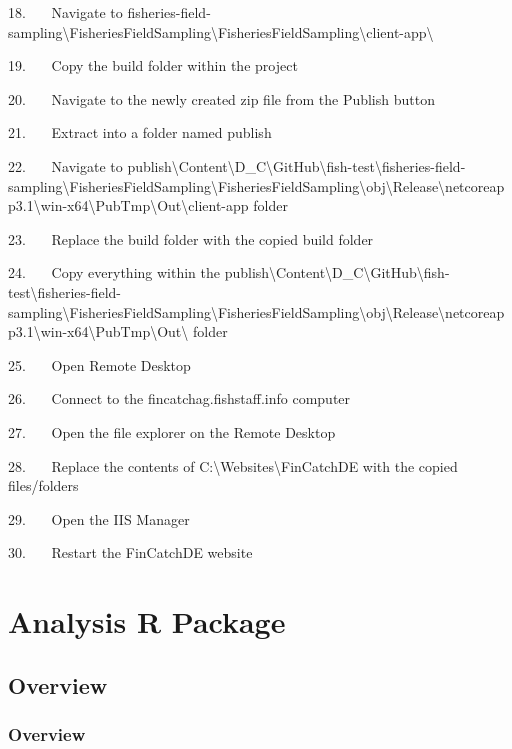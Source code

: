 \documentclass[
  letterpaper,
  DIV=11,
  numbers=noendperiod]{scrreprt}
\begin{document}
18.~~~ Navigate to
fisheries-field-sampling\textbackslash FisheriesFieldSampling\textbackslash FisheriesFieldSampling\textbackslash client-app\textbackslash{}

19.~~~ Copy the build folder within the project

20.~~~ Navigate to the newly created zip file from the Publish button

21.~~~ Extract into a folder named publish

22.~~~ Navigate to
publish\textbackslash Content\textbackslash D\_C\textbackslash GitHub\textbackslash fish-test\textbackslash fisheries-field-sampling\textbackslash FisheriesFieldSampling\textbackslash FisheriesFieldSampling\textbackslash obj\textbackslash Release\textbackslash netcoreapp3.1\textbackslash win-x64\textbackslash PubTmp\textbackslash Out\textbackslash client-app
folder

23.~~~ Replace the build folder with the copied build folder

24.~~~ Copy everything within the
publish\textbackslash Content\textbackslash D\_C\textbackslash GitHub\textbackslash fish-test\textbackslash fisheries-field-sampling\textbackslash FisheriesFieldSampling\textbackslash FisheriesFieldSampling\textbackslash obj\textbackslash Release\textbackslash netcoreapp3.1\textbackslash win-x64\textbackslash PubTmp\textbackslash Out\textbackslash{}
folder

25.~~~ Open Remote Desktop

26.~~~ Connect to the fincatchag.fishstaff.info computer

27.~~~ Open the file explorer on the Remote Desktop

28.~~~ Replace the contents of
C:\textbackslash Websites\textbackslash FinCatchDE with the copied
files/folders

29.~~~ Open the IIS Manager

30.~~~ Restart the FinCatchDE website

\part{Analysis R Package}

\chapter{Overview}\label{overview}

\section*{Overview}\label{overview-1}
\end{document}
